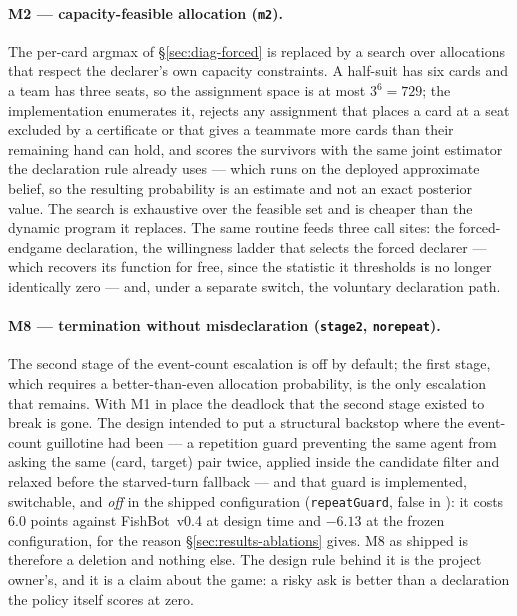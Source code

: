 \documentclass[11pt]{article}
\theoremstyle{definition}
\DeclareRobustCommand{\vfour}{\texorpdfstring{\mbox{FishBot v0.4}}{FishBot v0.4}}
\providecommand{\numAblRepeatGuardDelta}{-6.13}
\providecommand{\numGuardReject}{6.0}
\begin{document}
\paragraph{M2 --- capacity-feasible allocation (\texttt{m2}).} The per-card argmax
of \S\ref{sec:diag-forced} is replaced by a search over allocations that respect
the declarer's own capacity constraints. A half-suit has six cards and a team has
three seats, so the assignment space is at most $3^6 = 729$; the implementation
enumerates it, rejects any assignment that places a card at a seat excluded by a
certificate or that gives a teammate more cards than their remaining hand can
hold, and scores the survivors with the same joint estimator the declaration rule
already uses --- which runs on the deployed approximate belief, so the resulting
probability is an estimate and not an exact posterior value. The search is
exhaustive over the feasible set and is cheaper than the dynamic program it
replaces. The same routine feeds three call sites: the forced-endgame
declaration, the willingness ladder that selects the forced declarer --- which
recovers its function for free, since the statistic it thresholds is no longer
identically zero --- and, under a separate switch, the voluntary declaration
path.

\paragraph{M8 --- termination without misdeclaration (\texttt{stage2},
\texttt{norepeat}).} The second stage of the event-count escalation is off by
default; the first stage, which requires a better-than-even allocation
probability, is the only escalation that remains. With M1 in place the deadlock
that the second stage existed to break is gone. The design intended to put a
structural backstop where the event-count guillotine had been --- a repetition
guard preventing the same agent from asking the same (card, target) pair twice,
applied inside the candidate filter and relaxed before the starved-turn fallback
--- and that guard is implemented, switchable, and \emph{off} in the shipped
configuration (\texttt{repeatGuard}, false in ): it
costs \numGuardReject{} points against \vfour{} at design time and
$\numAblRepeatGuardDelta$ at the frozen configuration, for the reason
\S\ref{sec:results-ablations} gives. M8 as shipped is therefore a deletion and
nothing else. The design rule behind it is the project owner's, and it is a claim
about the game: a risky ask is better than a declaration the policy itself scores
at zero.
\end{document}
